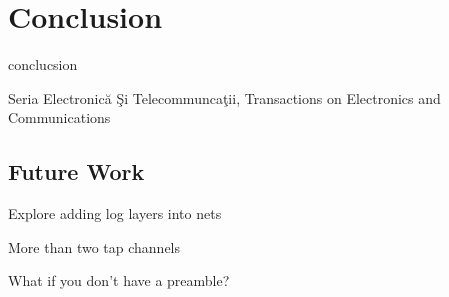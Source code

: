 \chapter{Conclusion}
conclucsion

Seria Electronic\u{a} \c{S}i Telecommunca\c{t}ii, Transactions on Electronics and Communications

\section{Future Work}

Explore adding log layers into nets

More than two tap channels

What if you don't have a preamble?